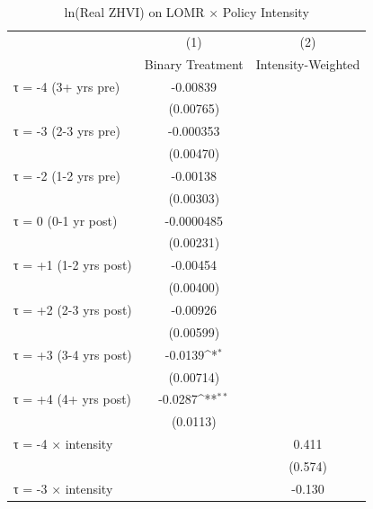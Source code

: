 \begin{table}[htbp]\centering
\def\sym#1{\ifmmode^{#1}\else\(^{#1}\)\fi}
\caption{ln(Real ZHVI) on LOMR × Policy Intensity}
\label{tab:intensity}
\begin{tabular}{l*{2}{c}}
\hline\hline
                    &\multicolumn{1}{c}{(1)}&\multicolumn{1}{c}{(2)}\\
                    &\multicolumn{1}{c}{Binary Treatment}&\multicolumn{1}{c}{Intensity-Weighted}\\
\hline
τ = -4 (3+ yrs pre) &    -0.00839         &                     \\
                    &   (0.00765)         &                     \\
[0.15em]
τ = -3 (2-3 yrs pre)&   -0.000353         &                     \\
                    &   (0.00470)         &                     \\
[0.15em]
τ = -2 (1-2 yrs pre)&    -0.00138         &                     \\
                    &   (0.00303)         &                     \\
[0.15em]
τ = 0 (0-1 yr post) &  -0.0000485         &                     \\
                    &   (0.00231)         &                     \\
[0.15em]
τ = +1 (1-2 yrs post)&    -0.00454         &                     \\
                    &   (0.00400)         &                     \\
[0.15em]
τ = +2 (2-3 yrs post)&    -0.00926         &                     \\
                    &   (0.00599)         &                     \\
[0.15em]
τ = +3 (3-4 yrs post)&     -0.0139\sym{*}  &                     \\
                    &   (0.00714)         &                     \\
[0.15em]
τ = +4 (4+ yrs post)&     -0.0287\sym{**} &                     \\
                    &    (0.0113)         &                     \\
[0.15em]
τ = -4 × intensity  &                     &       0.411         \\
                    &                     &     (0.574)         \\
[0.15em]
τ = -3 × intensity  &                     &      -0.130         \\

\end{tabular}
\end{table}
